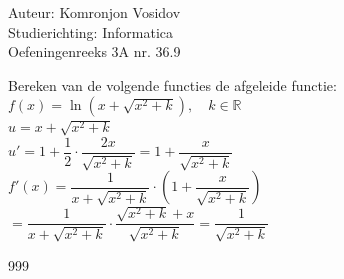 \documentclass[a4paper]{article}
\begin{document}
	
	\noindent \large Auteur: Komronjon Vosidov \\
	\noindent \large Studierichting: Informatica\\
	\noindent \large Oefeningenreeks 3A nr. 36.9\\
	
	\medskip
	
	\normalsize
	Bereken van de volgende functies de afgeleide functie:\\
	
	$f(x) = \ln \left( x + \sqrt{x^2 + k} \right), \quad k \in \mathbb{R}$\\
	
	$u = x + \sqrt{x^2 + k} $\\
	
	$u' = 1 + \dfrac{1}{2} \cdot \dfrac{2x}{\sqrt{x^2 + k}} = 1 + \dfrac{x}{\sqrt{x^2 + k}} $\\
	
	$f'(x) = \dfrac{1}{x + \sqrt{x^2 + k}} \cdot \left(1 + \dfrac{x}{\sqrt{x^2 + k}} \right)$ \\
	
	$=\dfrac{1}{x + \sqrt{x^2 + k}} \cdot \dfrac{\sqrt{x^2 + k} + x}{\sqrt{x^2 + k}} = \dfrac{1}{\sqrt{x^2 + k}}$
	
	
\begin{thebibliography}{999}
\end{thebibliography}		
\end{document}

